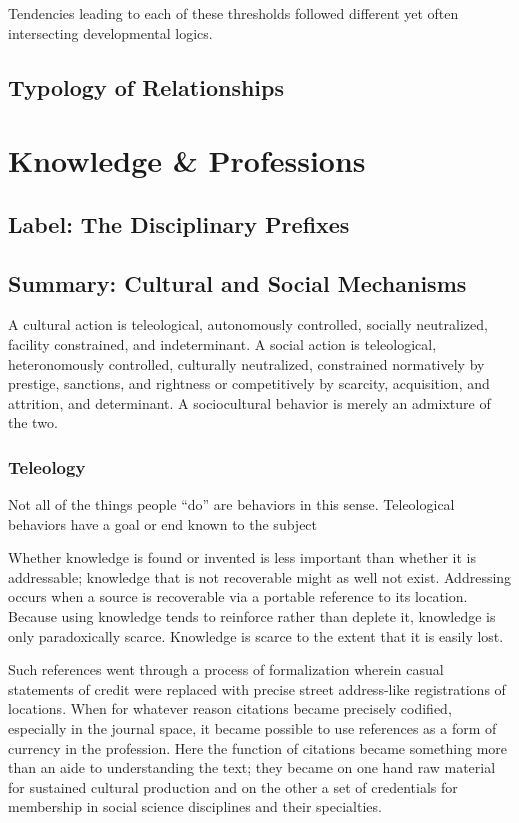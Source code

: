 \documentclass[]{article}
\begin{document}
Tendencies leading to each of these thresholds followed different yet
often intersecting developmental logics.

\subsection{Typology of Relationships}\label{typology-of-relationships}

\section{Knowledge \& Professions}\label{knowledge-professions}

\subsection{Label: The Disciplinary
Prefixes}\label{label-the-disciplinary-prefixes}

\subsection{Summary: Cultural and Social
Mechanisms}\label{summary-cultural-and-social-mechanisms}

A cultural action is teleological, autonomously controlled, socially
neutralized, facility constrained, and indeterminant. A social action is
teleological, heteronomously controlled, culturally neutralized,
constrained normatively by prestige, sanctions, and rightness or
competitively by scarcity, acquisition, and attrition, and determinant.
A sociocultural behavior is merely an admixture of the two.

\subsubsection{Teleology}\label{teleology}

Not all of the things people ``do'' are behaviors in this sense.
Teleological behaviors have a goal or end known to the subject

Whether knowledge is found or invented is less important than whether it
is addressable; knowledge that is not recoverable might as well not
exist. Addressing occurs when a source is recoverable via a portable
reference to its location. Because using knowledge tends to reinforce
rather than deplete it, knowledge is only paradoxically scarce.
Knowledge is scarce to the extent that it is easily lost.

Such references went through a process of formalization wherein casual
statements of credit were replaced with precise street address-like
registrations of locations. When for whatever reason citations became
precisely codified, especially in the journal space, it became possible
to use references as a form of currency in the profession. Here the
function of citations became something more than an aide to
understanding the text; they became on one hand raw material for
sustained cultural production and on the other a set of credentials for
membership in social science disciplines and their specialties.
\end{document}
